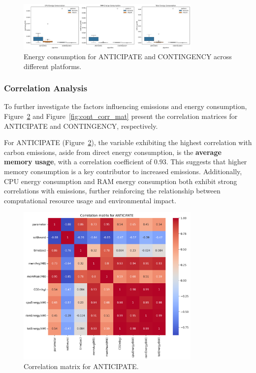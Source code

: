 \documentclass[a4paper,singleside,12pt]{report} %
\begin{document}
\begin{figure}[h!]
    \centering
    \includegraphics[width=0.8\textwidth]{imgs/energy_ant_cont.png}
    \caption{Energy consumption for ANTICIPATE and CONTINGENCY across different platforms.}
    \label{fig:ant_cont_energy}
\end{figure}

\subsubsection{Correlation Analysis}

To further investigate the factors influencing emissions and energy consumption, Figure~\ref{fig:ant_corr_mat} and Figure~\ref{fig:cont_corr_mat} present the correlation matrices for ANTICIPATE and 
CONTINGENCY, respectively.

For ANTICIPATE (Figure~\ref{fig:ant_corr_mat}), the variable exhibiting the highest correlation with carbon emissions, aside from direct energy consumption, is the \textbf{average memory usage}, 
with a correlation coefficient of $0.93$. This suggests that higher memory consumption is a key contributor to increased emissions. Additionally, CPU energy consumption and RAM energy consumption 
both exhibit strong correlations with emissions, further reinforcing the relationship between computational resource usage and environmental impact.

\begin{figure}[h!]
    \centering
    \includegraphics[width=0.8\textwidth]{imgs/ant_corr_mat.png}
    \caption{Correlation matrix for ANTICIPATE.}
    \label{fig:ant_corr_mat}
\end{figure}
\end{document}
